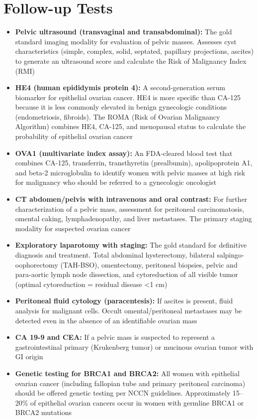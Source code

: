\section*{Follow-up Tests}
\begin{itemize}
  \item \textbf{Pelvic ultrasound (transvaginal and transabdominal):} The gold standard imaging modality for evaluation of pelvic masses. Assesses cyst characteristics (simple, complex, solid, septated, papillary projections, ascites) to generate an ultrasound score and calculate the Risk of Malignancy Index (RMI)
  \item \textbf{HE4 (human epididymis protein 4):} A second-generation serum biomarker for epithelial ovarian cancer. HE4 is more specific than CA-125 because it is less commonly elevated in benign gynecologic conditions (endometriosis, fibroids). The ROMA (Risk of Ovarian Malignancy Algorithm) combines HE4, CA-125, and menopausal status to calculate the probability of epithelial ovarian cancer
  \item \textbf{OVA1 (multivariate index assay):} An FDA-cleared blood test that combines CA-125, transferrin, transthyretin (prealbumin), apolipoprotein A1, and beta-2 microglobulin to identify women with pelvic masses at high risk for malignancy who should be referred to a gynecologic oncologist
  \item \textbf{CT abdomen/pelvis with intravenous and oral contrast:} For further characterization of a pelvic mass, assessment for peritoneal carcinomatosis, omental caking, lymphadenopathy, and liver metastases. The primary staging modality for suspected ovarian cancer
  \item \textbf{Exploratory laparotomy with staging:} The gold standard for definitive diagnosis and treatment. Total abdominal hysterectomy, bilateral salpingo-oophorectomy (TAH-BSO), omentectomy, peritoneal biopsies, pelvic and para-aortic lymph node dissection, and cytoreduction of all visible tumor (optimal cytoreduction = residual disease <1 cm)
  \item \textbf{Peritoneal fluid cytology (paracentesis):} If ascites is present, fluid analysis for malignant cells. Occult omental/peritoneal metastases may be detected even in the absence of an identifiable ovarian mass
  \item \textbf{CA 19-9 and CEA:} If a pelvic mass is suspected to represent a gastrointestinal primary (Krukenberg tumor) or mucinous ovarian tumor with GI origin
  \item \textbf{Genetic testing for BRCA1 and BRCA2:} All women with epithelial ovarian cancer (including fallopian tube and primary peritoneal carcinoma) should be offered genetic testing per NCCN guidelines. Approximately 15--20\% of epithelial ovarian cancers occur in women with germline BRCA1 or BRCA2 mutations
\end{itemize}

